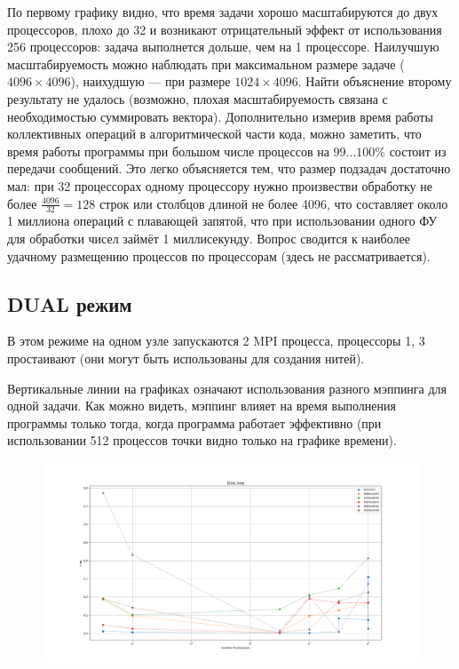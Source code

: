 \documentclass[14pt]{extarticle}
\begin{document}
По первому графику видно, что время задачи хорошо масштабируются до двух процессоров, плохо до 32 и возникают отрицательный эффект от использования 256 процессоров: задача выполнется дольше, чем на 1 процессоре. Наилучшую масштабируемость можно наблюдать при максимальном размере задаче ($4096 \times 4096$), наихудшую --- при размере $1024 \times 4096$. Найти объяснение второму результату не удалось (возможно, плохая масштабируемость связана с необходимостью суммировать вектора). Дополнительно измерив время работы коллективных операций в алгоритмической части кода, можно заметить, что время работы программы при большом числе процессов на $99...100\%$ состоит из передачи сообщений. Это легко объясняется тем, что размер подзадач достаточно мал: при 32 процессорах одному процессору нужно произвестви обработку не более $\frac{4096}{32}=128$ строк или столбцов длиной не более 4096, что составляет около 1 миллиона операций с плавающей запятой, что при использовании одного ФУ для обработки чисел займёт 1 миллисекунду. Вопрос сводится к наиболее удачному размещению процессов по процессорам (здесь не рассматривается).

\subsection{DUAL режим}
В этом режиме на одном узле запускаются 2 MPI процесса, процессоры 1, 3 простаивают (они могут быть использованы для создания нитей).

Вертикальные линии на графиках означают использования разного мэппинга для одной задачи. Как можно видеть, мэппинг влияет на время выполнения программы только тогда, когда программа работает эффективно (при использовании 512 процессов точки видно только на графике времени).

\begin{figure}[H]
	\centering
	\includegraphics[scale=0.4]{DUAL_time}
\end{figure}
\end{document}
